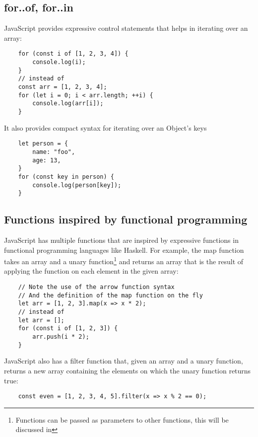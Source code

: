 \documentclass[11pt,a4paper]{article}
\begin{document}
\subsection{for..of, for..in}
JavaScript provides expressive control statements that helps in iterating over an array:
\begin{verbatim}
    for (const i of [1, 2, 3, 4]) {
        console.log(i);
    }
    // instead of
    const arr = [1, 2, 3, 4];
    for (let i = 0; i < arr.length; ++i) {
        console.log(arr[i]);
    }
\end{verbatim}
It also provides compact syntax for iterating over an Object's keys
\begin{verbatim}
    let person = {
        name: "foo",
        age: 13,
    }
    for (const key in person) {
        console.log(person[key]);
    }
\end{verbatim}

\subsection{Functions inspired by functional programming}
JavaScript has multiple functions that are inspired by expressive functions in functional programming languages like
Haskell. For example, the map function takes an array and a
unary function\footnote{Functions can be passed as parameters to other functions, this will be discussed in } and returns
an array that is the result of applying the function on each element in the given array:
\begin{verbatim}
    // Note the use of the arrow function syntax
    // And the definition of the map function on the fly
    let arr = [1, 2, 3].map(x => x * 2);
    // instead of
    let arr = [];
    for (const i of [1, 2, 3]) {
        arr.push(i * 2);
    }
\end{verbatim}
JavaScript also has a filter function that, given an array and a unary function,
returns a new array containing the elements on which the unary function returns true:
\begin{verbatim}
    const even = [1, 2, 3, 4, 5].filter(x => x % 2 == 0);
\end{verbatim}
\end{document}

